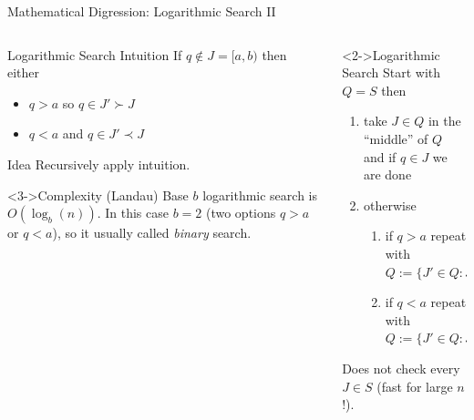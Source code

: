 \documentclass[xetex]{beamer}
\begin{document}
\begin{frame}{Mathematical Digression: Logarithmic Search II}
  \begin{columns}
    \begin{column}{.5\linewidth}
      \begin{block}{Logarithmic Search Intuition}
        If $q \notin J = [a,b)$ then either
        \begin{itemize}
          \item $q > a$ so $q \in J' \succ J$
          \item $q < a$ and $q \in J' \prec J$
        \end{itemize}
      \end{block}
      \begin{alertblock}{Idea}
        Recursively apply intuition.
      \end{alertblock}
      \begin{block}<3->{Complexity (Landau)}
        Base $b$ logarithmic search is $O(\log_b(n))$. In this case
        $b = 2$ (two options $q > a$ or $q < a$), so it usually called
        \emph{binary} search.
      \end{block}
    \end{column}
    \begin{column}{.5\linewidth}
      \begin{alertblock}<2->{Logarithmic Search}
        Start with $Q = S$ then
        \begin{enumerate}
          \item take $J \in Q$ in the ``middle'' of $Q$ and if $q \in J$ we are done
          \item otherwise
            \begin{enumerate}
              \item if $q > a$ repeat with $Q := \{J' \in Q : J' \succ J\}$
              \item if $q < a$ repeat with $Q := \{J' \in Q : J' \prec J\}$
            \end{enumerate}
        \end{enumerate}
        Does not check every $J \in S$ (fast for large $n$!).
      \end{alertblock}
    \end{column}
  \end{columns}
\end{frame}
\end{document}
